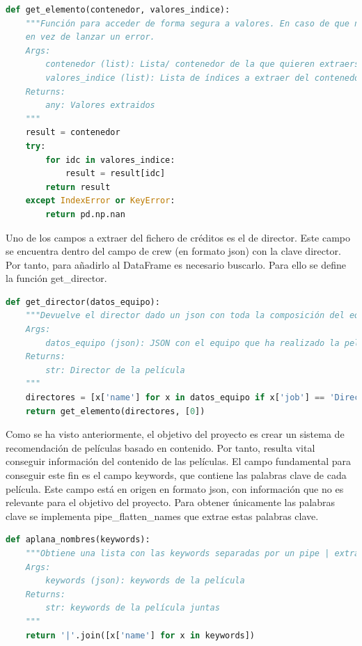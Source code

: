 \begin{lstlisting}[language=Python, caption={Acceso a los datos de forma segura. Se utiliza como proxy para no acceder directamente al valor. De esta forma, si se da un error, en vez de tener un error de ejecución se devuelve nulo.}]
def get_elemento(contenedor, valores_indice):
    """Función para acceder de forma segura a valores. En caso de que no se encuentre uno de ellos, se devuelve NaN
    en vez de lanzar un error.
    Args:
        contenedor (list): Lista/ contenedor de la que quieren extraerse los valores
        valores_indice (list): Lista de índices a extraer del contenedor
    Returns:
        any: Valores extraidos
    """
    result = contenedor
    try:
        for idc in valores_indice:
            result = result[idc]
        return result
    except IndexError or KeyError:
        return pd.np.nan
\end{lstlisting}

Uno de los campos a extraer del fichero de créditos es el de director. Este campo se encuentra dentro del campo de crew (en formato json) con la clave director. Por tanto, para añadirlo al DataFrame es necesario buscarlo. Para ello se define la función get\_director.
\begin{lstlisting}[language=Python, caption= {Obtención de una lista de directores extraidos del campo crew. Se itera por todos los miembros del equipo y se retienen unicamente aquellos que tienen el cargo de director.}]
def get_director(datos_equipo):
    """Devuelve el director dado un json con toda la composición del equipo de la película.
    Args:
        datos_equipo (json): JSON con el equipo que ha realizado la película
    Returns:
        str: Director de la película
    """
    directores = [x['name'] for x in datos_equipo if x['job'] == 'Director']
    return get_elemento(directores, [0])
\end{lstlisting}

Como se ha visto anteriormente, el objetivo del proyecto es crear un sistema de recomendación de películas basado en contenido. Por tanto, resulta vital conseguir información del contenido de las películas. El campo fundamental para conseguir este fin es el campo keywords, que contiene las palabras clave de cada película. Este campo está en origen en formato json, con información que no es relevante para el objetivo del proyecto. Para obtener únicamente las palabras clave se implementa pipe\_flatten\_names que extrae estas palabras clave.
\begin{lstlisting}[language=Python, caption= {Extracción de las palabras clave a partir del JSON del DataFrame. }]
def aplana_nombres(keywords):
    """Obtiene una lista con las keywords separadas por un pipe | extrayéndolas del json.
    Args:
        keywords (json): keywords de la película
    Returns:
        str: keywords de la película juntas
    """
    return '|'.join([x['name'] for x in keywords])
\end{lstlisting}

